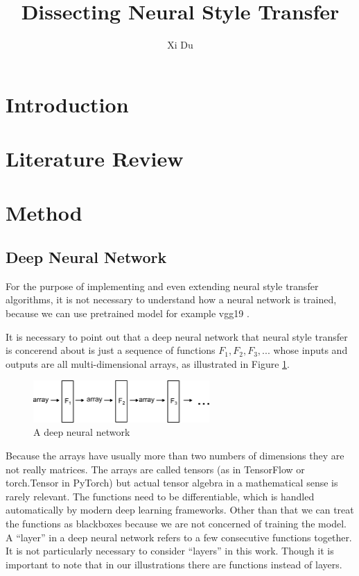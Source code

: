 \documentclass[runningheads]{llncs}
\begin{document}
\title{Dissecting Neural Style Transfer}
\author{Xi Du}
\maketitle 
\begin{abstract}
\cite{method}

\end{abstract}

\section{Introduction}

\section{Literature Review}

\section{Method}

\subsection{Deep Neural Network}

For the purpose of implementing and even extending neural style transfer algorithms,
it is not necessary to understand how a neural network is trained, because
we can use pretrained model for example vgg19 \cite{vgg19}.

It is necessary to point out that a deep neural network that neural style transfer
is concerend about
is just a sequence of functions
$F_1,F_2,F_3,...$
whose inputs and outputs are all multi-dimensional arrays, as illustrated in Figure \ref{f1f2f3}.
\begin{figure}
\center
\includegraphics[width=0.6\textwidth]{f1f2f3.pdf}
\caption{A deep neural network \label{f1f2f3}}
\end{figure}
Because the arrays have usually more than two numbers of dimensions
they are not really matrices.
The arrays are called tensors (as in TensorFlow or torch.Tensor in PyTorch) 
but actual tensor algebra in a mathematical sense is rarely relevant.
The functions need to be differentiable, which is handled automatically by modern 
deep learning frameworks.
Other than that we can treat the functions as blackboxes because we are 
not concerned of training the model.
A ``layer'' in a deep neural network refers to a few consecutive functions together.
It is not particularly necessary to consider ``layers'' in this work. 
Though it is important to note that in our illustrations there are functions instead of layers.
\end{document}
